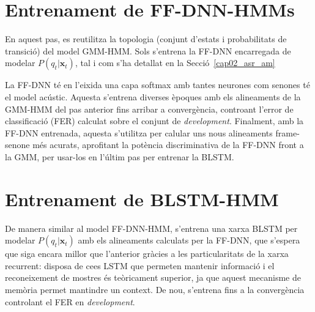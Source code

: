     
\section{Entrenament de FF-DNN-HMMs}
\label{cap03_dnnhmm}

En aquest pas, es reutilitza la topologia (conjunt d'estats i probabilitats de transició) del model GMM-HMM. Sols s'entrena la FF-DNN encarregada de modelar $P(q_t|\textbf{x}_t)$, tal i com s'ha detallat en la Secció~\ref{cap02_asr_am}

La FF-DNN té en l'eixida una capa softmax amb tantes neurones com senones té el model acústic. Aquesta s'entrena diverses èpoques amb els alineaments de la GMM-HMM del pas anterior fins arribar a convergència, contro\lgem ant l'error de classificació (FER) calculat sobre el conjunt de \textit{development}. Finalment, amb la FF-DNN entrenada, aquesta s'utilitza per calular uns nous alineaments frame-senone més acurats, aprofitant la potència discriminativa de la FF-DNN front a la GMM, per usar-los en l'últim pas per entrenar la BLSTM.


\section{Entrenament de BLSTM-HMM}
\label{cap03_blstmhmm}
De manera similar al model FF-DNN-HMM, s'entrena una xarxa BLSTM per modelar $P(q_t|\textbf{x}_t)$ amb els alineaments calculats per la FF-DNN, que s'espera que siga encara millor que l'anterior gràcies a les particularitats de la xarxa recurrent: disposa de ce\lgem es LSTM que permeten mantenir informació i el reconeixement de mostres és teòricament superior, ja que aquest mecanisme de memòria permet mantindre un context.
De nou, s'entrena fins a la convergència controlant el FER en \textit{development}.
